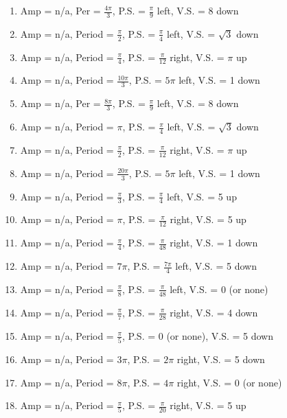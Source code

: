 \begin{enumerate}
	\item Amp = n/a, Per = $\frac{4\pi}{3}$, P.S. = $\frac{\pi}{9}$ left, V.S. = 8 down
	\item Amp = n/a, Period = $\frac{\pi}{2}$, P.S. = $\frac{\pi}{4}$ left, V.S. = $\sqrt{3}$ down
	\item Amp = n/a, Period = $\frac{\pi}{4}$, P.S. = $\frac{\pi}{12}$ right, V.S. = $\pi$ up
	\item Amp = n/a, Period = $\frac{10\pi}{3}$, P.S. = $5\pi$ left, V.S. = 1 down
	\item Amp = n/a, Per = $\frac{8\pi}{3}$, P.S. = $\frac{\pi}{9}$ left, V.S. = 8 down
	\item Amp = n/a, Period = $\pi$, P.S. = $\frac{\pi}{4}$ left, V.S. = $\sqrt{3}$ down
	\item Amp = n/a, Period = $\frac{\pi}{2}$, P.S. = $\frac{\pi}{12}$ right, V.S. = $\pi$ up
	\item Amp = n/a, Period = $\frac{20\pi}{3}$, P.S. = $5\pi$ left, V.S. = 1 down
	\item Amp = n/a, Period = $\frac{\pi}{3}$, P.S. = $\frac{\pi}{4}$ left, V.S. = 5 up
	\item Amp = n/a, Period = $\pi$, P.S. = $\frac{\pi}{12}$ right, V.S. = 5 up
	\item Amp = n/a, Period = $\frac{\pi}{4}$, P.S. = $\frac{\pi}{48}$ right, V.S. = 1 down
	\item Amp = n/a, Period = $7\pi$, P.S. = $\frac{7\pi}{4}$ left, V.S. = 5 down
	\item Amp = n/a, Period = $\frac{\pi}{8}$, P.S. = $\frac{\pi}{48}$ left, V.S. = 0 (or none)
	\item Amp = n/a, Period = $\frac{\pi}{7}$, P.S. = $\frac{\pi}{28}$ right, V.S. = 4 down
	\item Amp = n/a, Period = $\frac{\pi}{5}$, P.S. = 0 (or none), V.S. = 5 down
	\item Amp = n/a, Period = $3\pi$, P.S. = $2\pi$ right, V.S. = 5 down
	\item Amp = n/a, Period = $8\pi$, P.S. = $4\pi$ right, V.S. = 0 (or none)
	\item Amp = n/a, Period = $\frac{\pi}{5}$, P.S. = $\frac{\pi}{20}$ right, V.S. = 5 up
\end{enumerate}